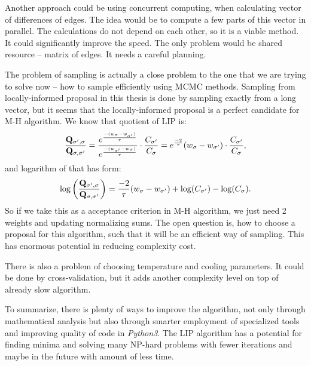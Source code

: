 	Another approach could be using concurrent computing, when calculating vector of differences of edges. The idea would be to compute a few parts of this vector in parallel. The calculations do not depend on each other, so it is a viable method. It could significantly improve the speed. The only problem would be shared resource  -- matrix of edges. It needs a careful planning.
	
	The problem of sampling is actually a close problem to the one that we are trying to solve now -- how to sample efficiently using MCMC methods. Sampling from locally-informed proposal in this thesis is done by sampling exactly from a long vector, but it seems that the locally-informed proposal is a perfect candidate for M-H algorithm. We know that quotient of LIP is:
	\begin{equation*}
		\frac{\mathbf{Q}_{\sigma',\sigma}}{\mathbf{Q}_{\sigma,\sigma'}} = \frac{e^\frac{-(w_{\sigma} - w_{\sigma'})}{\tau}}{e^\frac{-(w_{\sigma'} - w_\sigma)}{\tau}} \cdot \frac{C_{\sigma'}}{C_\sigma} =  e^\frac{-2}{\tau}(w_{\sigma} - w_{\sigma'}) \cdot \frac{C_{\sigma'}}{C_\sigma},
	\end{equation*}
	and logarithm of that has form:
	\begin{equation*}
		\log\left(\frac{\mathbf{Q}_{\sigma',\sigma}}{\mathbf{Q}_{\sigma,\sigma'}}\right)  = \frac{-2}{\tau}(w_{\sigma} - w_{\sigma'}) + \log(C_{\sigma'}) - \log(C_\sigma).
	\end{equation*}
	So if we take this as a acceptance criterion in M-H algorithm, we just need 2 weights and updating normalizing sums. The open question is, how to choose a proposal for this algorithm, such that it will be an efficient way of sampling. This has enormous potential in reducing complexity cost.
	
	There is also a problem of choosing temperature and cooling parameters. It could be done by cross-validation, but it adds another complexity level on top of already slow algorithm.
	
	To summarize, there is plenty of ways to improve the algorithm, not only through mathematical analysis but also through smarter employment of specialized tools and improving quality of code in \textit{Python3}. The LIP algorithm has a potential for finding minima and solving many NP-hard problems with fewer iterations and maybe in the future with amount of less time.